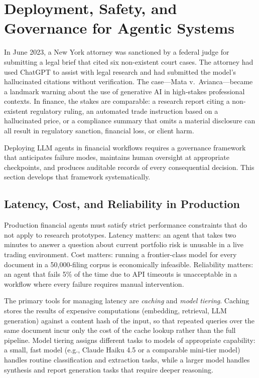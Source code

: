 
\section{Deployment, Safety, and Governance for Agentic Systems}
\label{sec:agent-governance}

\begin{context}
In June 2023, a New York attorney was sanctioned by a federal judge for submitting a
legal brief that cited six non-existent court cases. The attorney had used ChatGPT to
assist with legal research and had submitted the model's hallucinated citations without
verification. The case---Mata v.\ Avianca---became a landmark warning about the use
of generative AI in high-stakes professional contexts. In finance, the stakes are
comparable: a research report citing a non-existent regulatory ruling, an automated
trade instruction based on a hallucinated price, or a compliance summary that omits a
material disclosure can all result in regulatory sanction, financial loss, or client harm.

Deploying LLM agents in financial workflows requires a governance framework that
anticipates failure modes, maintains human oversight at appropriate checkpoints, and
produces auditable records of every consequential decision. This section develops that
framework systematically.


\subsection{Latency, Cost, and Reliability in Production}
\label{subsec:production}

Production financial agents must satisfy strict performance constraints that do not
apply to research prototypes. Latency matters: an agent that takes two minutes to
answer a question about current portfolio risk is unusable in a live trading
environment. Cost matters: running a frontier-class model for every document in a
50,000-filing corpus is economically infeasible. Reliability matters: an agent that
fails 5\% of the time due to API timeouts is unacceptable in a workflow where every
failure requires manual intervention.

The primary tools for managing latency are \emph{caching} and \emph{model tiering}.
Caching stores the results of expensive computations (embedding, retrieval, LLM
generation) against a content hash of the input, so that repeated queries over the
same document incur only the cost of the cache lookup rather than the full pipeline.
Model tiering assigns different tasks to models of appropriate capability: a small,
fast model (e.g., Claude Haiku 4.5 or a comparable mini-tier model) handles routine classification and
extraction tasks, while a larger model handles synthesis and report generation tasks
that require deeper reasoning.


\end{context}
